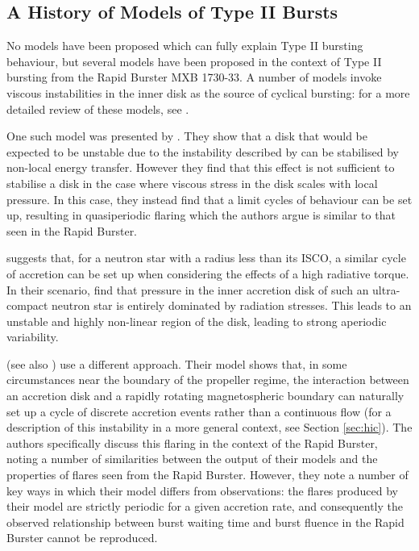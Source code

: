 \subsection{A History of Models of Type II Bursts}

\label{sec:TIImod}

\par {}No models have been proposed which can fully explain Type II bursting behaviour, but several models have been proposed in the context of Type II bursting from the Rapid Burster MXB 1730-33.  A number of models invoke viscous instabilities in the inner disk as the source of cyclical bursting: for a more detailed review of these models, see \citet{Lewin_Bursts}.
\par One such model was presented by \citet{Taam_Evo}.  They show that a disk that would be expected to be unstable due to the instability described by \citealp{Shakura_Instab} can be stabilised by non-local energy transfer.  However they find that this effect is not sufficient to stabilise a disk in the case where viscous stress in the disk scales with local pressure.  In this case, they instead find that a limit cycles of behaviour can be set up, resulting in quasiperiodic flaring which the authors argue is similar to that seen in the Rapid Burster.
\par \citet{Walker_Type2Mod} suggests that, for a neutron star with a radius less than its ISCO, a similar cycle of accretion can be set up when considering the effects of a high radiative torque.  In their scenario, \citeauthor{Walker_Type2Mod} find that pressure in the inner accretion disk of such an ultra-compact neutron star is entirely dominated by radiation stresses.  This leads to an unstable and highly non-linear region of the disk, leading to strong aperiodic variability.
\par \citet{Spruit_Type2Mod} (see also \citealp{Dangelo_Episodic1,Dangelo_Episodic2}) use a different approach.  Their model shows that, in some circumstances near the boundary of the propeller regime, the interaction between an accretion disk and a rapidly rotating magnetospheric boundary can naturally set up a cycle of discrete accretion events rather than a continuous flow (for a description of this instability in a more general context, see Section \ref{sec:hic}).  The authors specifically discuss this flaring in the context of the Rapid Burster, noting a number of similarities between the output of their models and the properties of flares seen from the Rapid Burster.  However, they note a number of key ways in which their model differs from observations: the flares produced by their model are strictly periodic for a given accretion rate, and consequently the observed relationship between burst waiting time and burst fluence in the Rapid Burster cannot be reproduced.
